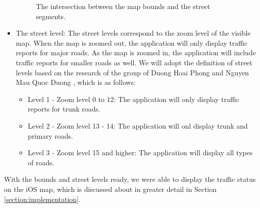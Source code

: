 \begin{itemize}
\begin{figure}[H]
        \caption{The intersection between the map bounds and the street segments.}
        \label{fig:intersetion_ne_sw_bounds}
    \end{figure}
    \item The street level: The street levels correspond to the zoom level of the visible map. When the map is zoomed out, the application will only display traffic reports for major roads. As the map is zoomed in, the application will include traffic reports for smaller roads as well. We will adopt the definition of street levels based on the research of the group of Duong Hoai Phong and Nguyen Mau Quoc Duong \cite{phong_duong}, which is as follows:
    \begin{itemize}
        \item Level 1 - Zoom level 0 to 12: The application will only display traffic reports for trunk roads.
        \item Level 2 - Zoom level 13 - 14: The application will onl display trunk and primary roads.
        \item Level 3 - Zoom level 15 and higher: The application will display all types of roads.
    \end{itemize}
\end{itemize}

With the bounds and street levels ready, we were able to display the traffic status on the iOS map, which is discussed about in greater detail in Section \ref{section:implementation}.
